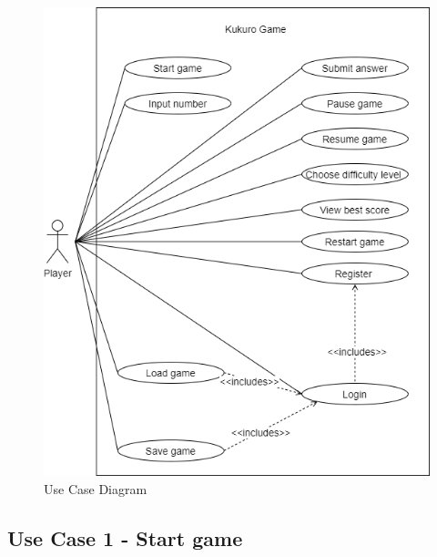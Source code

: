 \documentclass[12pt]{article}
\begin{document}
\begin{figure}[htbp]
    \centering
    \includegraphics[scale=0.6]{UseCaseDiagram}
    \caption{Use Case Diagram}
    \label{fig:UseCaseDiagram}
\end{figure}

\newpage


\subsection{Use Case 1 - Start game} 
\end{document}
